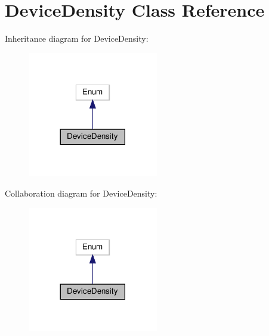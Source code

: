 \hypertarget{classstm__tools_1_1serialflasher_1_1devices_1_1DeviceDensity}{}\section{Device\+Density Class Reference}
\label{classstm__tools_1_1serialflasher_1_1devices_1_1DeviceDensity}


Inheritance diagram for Device\+Density\+:
\nopagebreak
\begin{figure}[H]
\begin{center}
\leavevmode
\includegraphics[width=161pt]{classstm__tools_1_1serialflasher_1_1devices_1_1DeviceDensity__inherit__graph}
\end{center}
\end{figure}


Collaboration diagram for Device\+Density\+:
\nopagebreak
\begin{figure}[H]
\begin{center}
\leavevmode
\includegraphics[width=161pt]{classstm__tools_1_1serialflasher_1_1devices_1_1DeviceDensity__coll__graph}
\end{center}
\end{figure}
